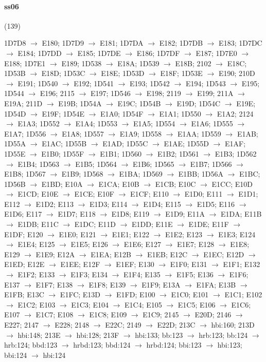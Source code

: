 \paragraph{ss06} (139)
\raggedright\small 1D7D8 $\to$ E180; 1D7D9 $\to$ E181; 1D7DA $\to$ E182; 1D7DB
$\to$ E183; 1D7DC $\to$ E184; 1D7DD $\to$ E185; 1D7DE $\to$ E186; 1D7DF $\to$
E187; 1D7E0 $\to$ E188; 1D7E1 $\to$ E189; 1D538 $\to$ E18A; 1D539 $\to$ E18B;
2102 $\to$ E18C; 1D53B $\to$ E18D; 1D53C $\to$ E18E; 1D53D $\to$ E18F; 1D53E
$\to$ E190; 210D $\to$ E191; 1D540 $\to$ E192; 1D541 $\to$ E193; 1D542 $\to$
E194; 1D543 $\to$ E195; 1D544 $\to$ E196; 2115 $\to$ E197; 1D546 $\to$ E198;
2119 $\to$ E199; 211A $\to$ E19A; 211D $\to$ E19B; 1D54A $\to$ E19C; 1D54B
$\to$ E19D; 1D54C $\to$ E19E; 1D54D $\to$ E19F; 1D54E $\to$ E1A0; 1D54F $\to$
E1A1; 1D550 $\to$ E1A2; 2124 $\to$ E1A3; 1D552 $\to$ E1A4; 1D553 $\to$ E1A5;
1D554 $\to$ E1A6; 1D555 $\to$ E1A7; 1D556 $\to$ E1A8; 1D557 $\to$ E1A9; 1D558
$\to$ E1AA; 1D559 $\to$ E1AB; 1D55A $\to$ E1AC; 1D55B $\to$ E1AD; 1D55C $\to$
E1AE; 1D55D $\to$ E1AF; 1D55E $\to$ E1B0; 1D55F $\to$ E1B1; 1D560 $\to$ E1B2;
1D561 $\to$ E1B3; 1D562 $\to$ E1B4; 1D563 $\to$ E1B5; 1D564 $\to$ E1B6; 1D565
$\to$ E1B7; 1D566 $\to$ E1B8; 1D567 $\to$ E1B9; 1D568 $\to$ E1BA; 1D569 $\to$
E1BB; 1D56A $\to$ E1BC; 1D56B $\to$ E1BD; E10A $\to$ E1CA; E10B $\to$ E1CB;
E10C $\to$ E1CC; E10D $\to$ E1CD; E10E $\to$ E1CE; E10F $\to$ E1CF; E110 $\to$
E1D0; E111 $\to$ E1D1; E112 $\to$ E1D2; E113 $\to$ E1D3; E114 $\to$ E1D4; E115
$\to$ E1D5; E116 $\to$ E1D6; E117 $\to$ E1D7; E118 $\to$ E1D8; E119 $\to$ E1D9;
E11A $\to$ E1DA; E11B $\to$ E1DB; E11C $\to$ E1DC; E11D $\to$ E1DD; E11E $\to$
E1DE; E11F $\to$ E1DF; E120 $\to$ E1E0; E121 $\to$ E1E1; E122 $\to$ E1E2; E123
$\to$ E1E3; E124 $\to$ E1E4; E125 $\to$ E1E5; E126 $\to$ E1E6; E127 $\to$ E1E7;
E128 $\to$ E1E8; E129 $\to$ E1E9; E12A $\to$ E1EA; E12B $\to$ E1EB; E12C $\to$
E1EC; E12D $\to$ E1ED; E12E $\to$ E1EE; E12F $\to$ E1EF; E130 $\to$ E1F0; E131
$\to$ E1F1; E132 $\to$ E1F2; E133 $\to$ E1F3; E134 $\to$ E1F4; E135 $\to$ E1F5;
E136 $\to$ E1F6; E137 $\to$ E1F7; E138 $\to$ E1F8; E139 $\to$ E1F9; E13A $\to$
E1FA; E13B $\to$ E1FB; E13C $\to$ E1FC; E13D $\to$ E1FD; E100 $\to$ E1C0; E101
$\to$ E1C1; E102 $\to$ E1C2; E103 $\to$ E1C3; E104 $\to$ E1C4; E105 $\to$ E1C5;
E106 $\to$ E1C6; E107 $\to$ E1C7; E108 $\to$ E1C8; E109 $\to$ E1C9; 2145 $\to$
E20D; 2146 $\to$ E227; 2147 $\to$ E228; 2148 $\to$ E22C; 2149 $\to$ E22D; 213C
$\to$ hbi:160; 213D $\to$ hbi:148; 213E $\to$ hbi:128; 213F $\to$ hbi:133;
bb:123 $\to$ hrb:123; bb:124 $\to$ hrb:124; bbd:123 $\to$ hrbd:123; bbd:124
$\to$ hrbd:124; bbi:123 $\to$ hbi:123; bbi:124 $\to$ hbi:124\par

